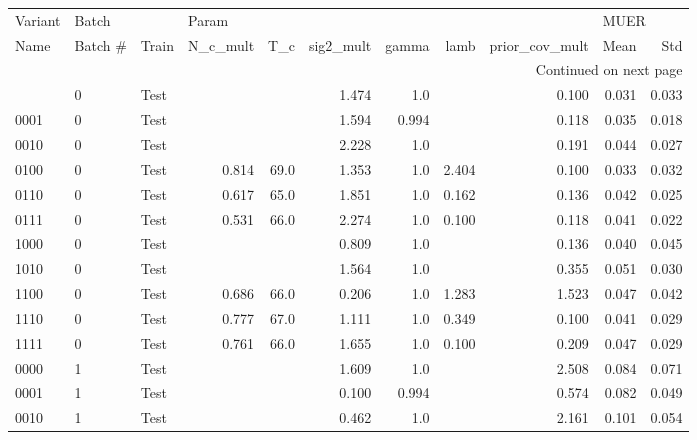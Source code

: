 \begingroup
\setlength{\LTleft}{-20cm plus -1fill}
\setlength{\LTright}{\LTleft}
\begin{longtable}{lllrrrrrrrr}
\toprule
Variant & \multicolumn{2}{l}{Batch} & \multicolumn{6}{l}{Param} & \multicolumn{2}{l}{MUER} \\
   Name & Batch \# &  Train & N\_c\_mult &    T\_c & sig2\_mult & gamma &  lamb & prior\_cov\_mult &  Mean &   Std \\
\midrule
\endhead
\midrule
\multicolumn{11}{r}{{Continued on next page}} \\
\midrule
\endfoot

\bottomrule
\endlastfoot
   0000 &       0 &  Test &       &     &     1.474 & 1.0 &    &          0.100 & 0.031 & 0.033 \\
   0001 &       0 &  Test &       &     &     1.594 & 0.994 &    &          0.118 & 0.035 & 0.018 \\
   0010 &       0 &  Test &       &     &     2.228 & 1.0 &    &          0.191 & 0.044 & 0.027 \\
   0100 &       0 &  Test &    0.814 & 69.0 &     1.353 & 1.0 & 2.404 &          0.100 & 0.033 & 0.032 \\
   0110 &       0 &  Test &    0.617 & 65.0 &     1.851 & 1.0 & 0.162 &          0.136 & 0.042 & 0.025 \\
   0111 &       0 &  Test &    0.531 & 66.0 &     2.274 & 1.0 & 0.100 &          0.118 & 0.041 & 0.022 \\
   1000 &       0 &  Test &       &     &     0.809 & 1.0 &    &          0.136 & 0.040 & 0.045 \\
   1010 &       0 &  Test &       &     &     1.564 & 1.0 &    &          0.355 & 0.051 & 0.030 \\
   1100 &       0 &  Test &    0.686 & 66.0 &     0.206 & 1.0 & 1.283 &          1.523 & 0.047 & 0.042 \\
   1110 &       0 &  Test &    0.777 & 67.0 &     1.111 & 1.0 & 0.349 &          0.100 & 0.041 & 0.029 \\
   1111 &       0 &  Test &    0.761 & 66.0 &     1.655 & 1.0 & 0.100 &          0.209 & 0.047 & 0.029 \\
   0000 &       1 &  Test &       &     &     1.609 & 1.0 &    &          2.508 & 0.084 & 0.071 \\
   0001 &       1 &  Test &       &     &     0.100 & 0.994 &    &          0.574 & 0.082 & 0.049 \\
   0010 &       1 &  Test &       &     &     0.462 & 1.0 &    &          2.161 & 0.101 & 0.054 \\

\end{longtable}
